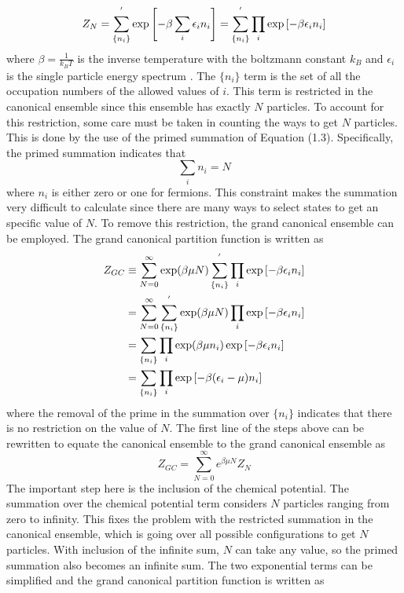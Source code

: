 \begin{equation}
    Z_N=\sum_{\{n_i\}}^{'} \exp\qty[-\beta\sum_{i} \epsilon_i n_i]=\sum_{\{n_i\}}^{'} \prod_i \exp\qty[-\beta\epsilon_i n_i]
\end{equation}
where $\beta=\frac{1}{k_B T}$ is the inverse temperature with the boltzmann constant $k_B$ and $\epsilon_i$ is the single particle energy spectrum \cite{Kardar}. The $\{n_i\}$ term is the set of all the occupation numbers of the allowed values of $i$. This term is restricted in the canonical ensemble since this ensemble has exactly $N$ particles. To account for this restriction, some care must be taken in counting the ways to get $N$ particles. This is done by the use of the primed summation of Equation (1.3). Specifically, the primed summation indicates that 
\begin{equation}
    \sum_i n_i=N
\end{equation}
where $n_i$ is either zero or one for fermions. This constraint makes the summation very difficult to calculate since there are many ways to select states to get an specific value of $N$. To remove this restriction, the grand canonical ensemble can be employed. The grand canonical partition function is written as 
\begin{align}
    Z_{GC}&\equiv\sum_{N=0}^{\infty} \exp(\beta\mu N) \sum_{\{n_i\}}^{'} \prod_i \exp\qty[-\beta\epsilon_i n_i]\nonumber\\
    &=\sum_{N=0}^{\infty}\sum_{\{n_i\}}^{'} \exp(\beta\mu N) \prod_i \exp\qty[-\beta\epsilon_i n_i]\nonumber\\
    &=\sum_{\{n_i\}} \prod_i \exp(\beta\mu n_i) \exp\qty[-\beta\epsilon_i n_i]\nonumber\\
    &=\sum_{\{n_i\}} \prod_i \exp\qty[-\beta\qty(\epsilon_i-\mu)n_i]\\
\end{align}
where the removal of the prime in the summation over $\{n_i\}$ indicates that there is no restriction on the value of $N$. The first line of the steps above can be rewritten to equate the canonical ensemble to the grand canonical ensemble as
\begin{equation}
    Z_{GC}=\sum_{N=0}^{\infty} e^{\beta\mu N} Z_N
\end{equation}
 The important step here is the inclusion of the chemical potential. The summation over the chemical potential term considers $N$ particles ranging from zero to infinity. This fixes the problem with the restricted summation in the canonical ensemble, which is going over all possible configurations to get $N$ particles. With inclusion of the infinite sum, $N$ can take any value, so the primed summation also becomes an infinite sum. The two exponential terms can be simplified and the grand canonical partition function is written as 
